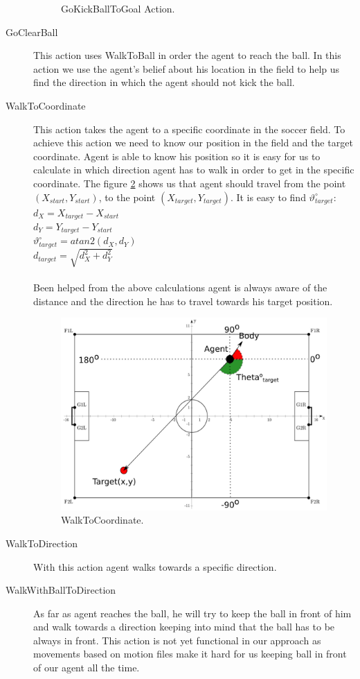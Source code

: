 \begin{description}
\begin{figure}[!h]
  \caption{GoKickBallToGoal Action.}
  \label{fig:GoKickBallToGoal}
\end{figure}
 \item[GoClearBall] This action uses WalkToBall in order the agent to reach the ball. In this action we use the agent's belief about his location in the field to help us find the direction in which the agent should not kick the ball.
 \item[WalkToCoordinate]
 This action takes the agent to a specific coordinate in the soccer field. To achieve this action we need to know our position in the field and the target coordinate. Agent is able to know his position so it is easy for us to calculate in which direction agent has to walk in order to get in the specific coordinate. The figure \ref{fig:WalkToCoordinate} shows us that agent should travel from the point $(X_{start},Y_{start})$, to the point $(X_{target},Y_{target})$. It is easy to find $\vartheta_{target}^{\circ}$:\\
$d_{X} = X_{target} - X_{start}$\\
$d_{Y} = Y_{target} - Y_{start}$\\
$\vartheta_{target}^{\circ} = atan2(d_{X},d_{Y})$\\
$d_{target} = \sqrt{d_{X}^2 + d_{Y}^2}$\\
\\
Been helped from the above calculations agent is always aware of the distance and the direction he has to travel towards his target position. 
 \begin{figure}[!h]
\centering
  \includegraphics[scale=0.6]{Chapter3/figures/GoToPos.pdf}
  \caption{WalkToCoordinate.}
  \label{fig:WalkToCoordinate}
\end{figure}
 \item[WalkToDirection]
 With this action agent walks towards a specific direction.
 \item[WalkWithBallToDirection]
 As far as agent reaches the ball, he will try to keep the ball in front of him and walk towards a direction keeping into mind that the ball has to be always in front. This action is not yet functional in our approach as movements based on motion files make it hard for us keeping ball in front of our agent all the time.
\end{description}

